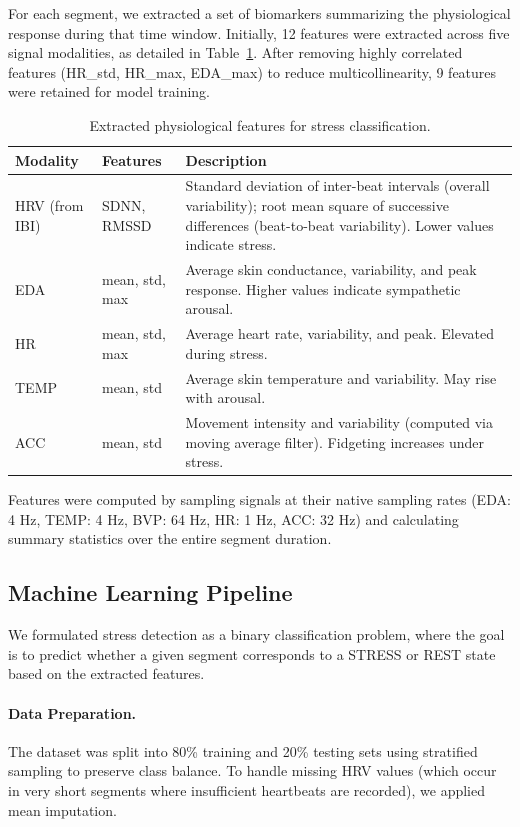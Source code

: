 \documentclass[12pt,letterpaper]{article}
\begin{document}
For each segment, we extracted a set of biomarkers summarizing the physiological response during that time window. Initially, 12 features were extracted across five signal modalities, as detailed in Table~\ref{tab:features}. After removing highly correlated features (HR\_std, HR\_max, EDA\_max) to reduce multicollinearity, 9 features were retained for model training.

\begin{table}[H]
\centering
\caption{Extracted physiological features for stress classification.}
\label{tab:features}
\begin{tabular}{p{3cm}p{4cm}p{7cm}}
\toprule
\textbf{Modality} & \textbf{Features} & \textbf{Description} \\
\midrule
HRV (from IBI) & SDNN, RMSSD & Standard deviation of inter-beat intervals (overall variability); root mean square of successive differences (beat-to-beat variability). Lower values indicate stress. \\[4pt]
EDA & mean, std, max & Average skin conductance, variability, and peak response. Higher values indicate sympathetic arousal. \\[4pt]
HR & mean, std, max & Average heart rate, variability, and peak. Elevated during stress. \\[4pt]
TEMP & mean, std & Average skin temperature and variability. May rise with arousal. \\[4pt]
ACC & mean, std & Movement intensity and variability (computed via moving average filter). Fidgeting increases under stress. \\
\bottomrule
\end{tabular}
\end{table}

Features were computed by sampling signals at their native sampling rates (EDA: 4 Hz, TEMP: 4 Hz, BVP: 64 Hz, HR: 1 Hz, ACC: 32 Hz) and calculating summary statistics over the entire segment duration.

\subsection{Machine Learning Pipeline}

We formulated stress detection as a binary classification problem, where the goal is to predict whether a given segment corresponds to a STRESS or REST state based on the extracted features.

\paragraph{Data Preparation.} The dataset was split into 80\% training and 20\% testing sets using stratified sampling to preserve class balance. To handle missing HRV values (which occur in very short segments where insufficient heartbeats are recorded), we applied mean imputation.
\end{document}
